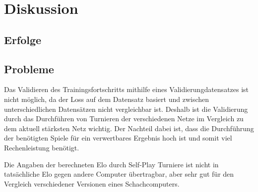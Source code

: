 \chapter{Diskussion}

\section{Erfolge}

\section{Probleme}

Das Validieren des Trainingsfortschritts mithilfe eines Validierungdatensatzes ist nicht möglich, da der Loss auf dem Datensatz basiert und zwischen unterschiedlichen Datensätzen nicht vergleichbar ist. Deshalb ist die Validierung durch das Durchführen von Turnieren der verschiedenen Netze im Vergleich zu dem aktuell stärksten Netz wichtig. Der Nachteil dabei ist, dass die Durchführung der benötigten Spiele für ein verwertbares Ergebnis hoch ist und somit viel Rechenleistung benötigt.

Die Angaben der berechneten Elo durch Self-Play Turniere ist nicht in tatsächliche Elo gegen andere Computer übertragbar, aber sehr gut für den Vergleich verschiedener Versionen eines Schachcomputers.



